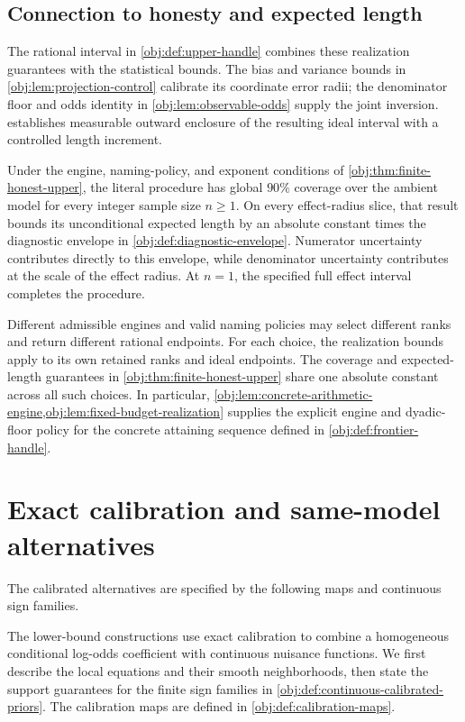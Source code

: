 \documentclass[11pt]{article}
\begin{document}
\subsection{Connection to honesty and expected length}

The rational interval  in \cref{obj:def:upper-handle} combines these realization guarantees with the statistical bounds. The bias and variance bounds in \cref{obj:lem:projection-control} calibrate its coordinate error radii; the denominator floor and odds identity in \cref{obj:lem:observable-odds} supply the joint inversion.  establishes measurable outward enclosure of the resulting ideal interval with a controlled length increment.

Under the engine, naming-policy, and exponent conditions of \cref{obj:thm:finite-honest-upper}, the literal procedure has global \(90\%\) coverage over the ambient model for every integer sample size \(n\ge1\). On every effect-radius slice, that result bounds its unconditional expected length by an absolute constant times the diagnostic envelope in \cref{obj:def:diagnostic-envelope}. Numerator uncertainty contributes directly to this envelope, while denominator uncertainty contributes at the scale of the effect radius. At \(n=1\), the specified full effect interval completes the procedure.

Different admissible engines and valid naming policies may select different ranks and return different rational endpoints. For each choice, the realization bounds apply to its own retained ranks and ideal endpoints. The coverage and expected-length guarantees in \cref{obj:thm:finite-honest-upper} share one absolute constant across all such choices. In particular, \cref{obj:lem:concrete-arithmetic-engine,obj:lem:fixed-budget-realization} supplies the explicit engine and dyadic-floor policy for the concrete attaining sequence defined in \cref{obj:def:frontier-handle}.


\section{Exact calibration and same-model alternatives}

The calibrated alternatives are specified by the following maps and continuous sign families.

The lower-bound constructions use exact calibration to combine a homogeneous conditional log-odds coefficient with continuous nuisance functions. We first describe the local equations and their smooth neighborhoods, then state the support guarantees for the finite sign families in \cref{obj:def:continuous-calibrated-priors}. The calibration maps are defined in \cref{obj:def:calibration-maps}.
\end{document}
